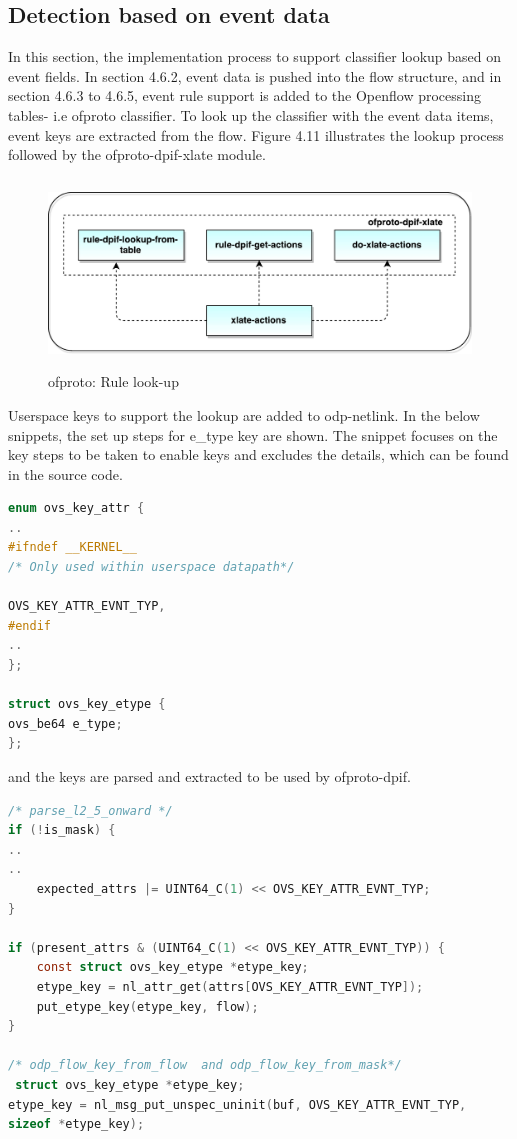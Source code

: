 \subsection{Detection based on event data}
In this section, the implementation process to support classifier lookup based on event fields. In section 4.6.2, event data is pushed into the flow structure, and in section 4.6.3 to 4.6.5, event rule support is added to the Openflow processing tables- i.e ofproto classifier. To look up the classifier with the event data items, event keys are extracted from the flow. Figure 4.11 illustrates the lookup process followed by the ofproto-dpif-xlate module.

\begin{figure}[H]
	\centering
	\caption{ofproto: Rule look-up}
	\includegraphics[height=5cm]{ofproto-dpif-xlate.pdf}
\end{figure}

Userspace keys to support the lookup are added to odp-netlink. In the below snippets, the set up steps for e_type key are shown. The snippet focuses on the key steps to be taken to enable keys and excludes the details, which can be found in the source code. \newline

\begin{lstlisting}[language=c]
enum ovs_key_attr {
..
#ifndef __KERNEL__
/* Only used within userspace datapath*/	

OVS_KEY_ATTR_EVNT_TYP,
#endif
..
};

struct ovs_key_etype {
ovs_be64 e_type;
};

\end{lstlisting}

and the keys are parsed and extracted to be used by ofproto-dpif. \newline
\begin{lstlisting}[language=c]
/* parse_l2_5_onward */
if (!is_mask) {
..
..
	expected_attrs |= UINT64_C(1) << OVS_KEY_ATTR_EVNT_TYP;
}

if (present_attrs & (UINT64_C(1) << OVS_KEY_ATTR_EVNT_TYP)) {
	const struct ovs_key_etype *etype_key;	
	etype_key = nl_attr_get(attrs[OVS_KEY_ATTR_EVNT_TYP]);
	put_etype_key(etype_key, flow);
}

/* odp_flow_key_from_flow  and odp_flow_key_from_mask*/
 struct ovs_key_etype *etype_key;  
etype_key = nl_msg_put_unspec_uninit(buf, OVS_KEY_ATTR_EVNT_TYP,
sizeof *etype_key); 
\end{lstlisting}


